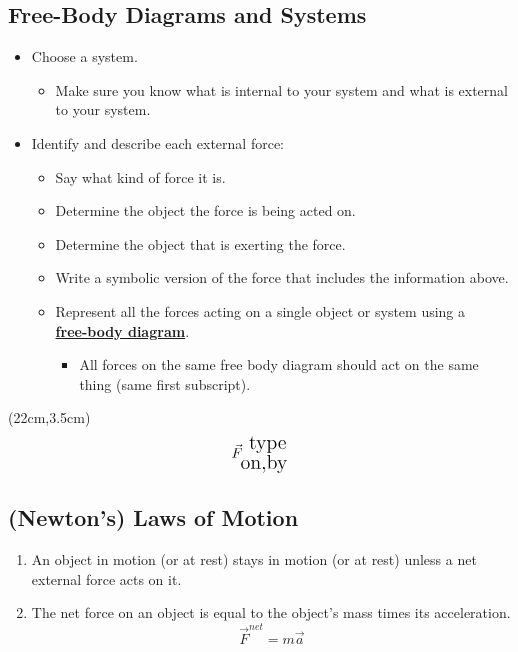 \documentclass[]{article}
\begin{document}
\begin{PresentSpace}
\vspace{-10pt}
\section*{Free-Body Diagrams and Systems}
\vspace{-10pt}
\begin{itemize}
	\item Choose a system.
	\begin{itemize}
		\large
		\item Make sure you know what is internal to your system and what is external to your system.
	\end{itemize}
	\item Identify and describe each external force:
	\begin{itemize}
		\large
		\item Say what kind of force it is.
		\item Determine the object the force is being acted on.
		\item Determine the object that is exerting the force.
		\item Write a symbolic version of the force that includes the information above.
		\item Represent all the forces acting on a single object or system using a \\
		\textbf{\underline{free-body diagram}}.
		\begin{itemize}
			\item All forces on the same free body diagram should act on the same thing (same first subscript).
		\end{itemize}
	\end{itemize}
\end{itemize}
\end{PresentSpace}
\begin{textblock*}{5cm}(22cm,3.5cm)
	\Huge
	\[
	\vec{F}^{\text{\Large\ type}}_{\text{\Large on,by}}
	\]
\end{textblock*}
\newpage
\begin{TeacherMargin}

\end{TeacherMargin}
\begin{PresentSpace}
\vspace{-10pt}
\section*{(Newton's) Laws of Motion}
\vspace{-10pt}
\begin{enumerate}[(1)]
	\item An object in motion (or at rest) stays in motion (or at rest) unless a net external force acts on it.
	\item The net force on an object is equal to the object's mass times its acceleration.
	\[
	\vec{F}^{net} = m\vec{a}
	\]
\end{enumerate}
\end{PresentSpace}
\end{document}
